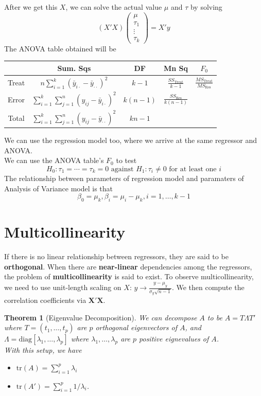 \documentclass[11pt]{article}
\newcommand{\tr}{\mathrm{tr}}
\newtheorem{theorem}{Theorem}[section]
\theoremstyle{definition}
\begin{document}
After we get this $X$, we can solve the actual value $\mu$ and $\tau$ by solving
\[
(X'X)\begin{pmatrix} \mu\\\tau_1\\\vdots\\\tau_k\end{pmatrix}=X'y
\]
The ANOVA table obtained will be
\begin{table}[h]
\centering
\begin{tabular}{|c|c|c|c|c|}
\hline
 & Sum. Sqs & DF & Mn Sq & $F_0$\\\hline
Treat & $\displaystyle n\sum_{i=1}^k(\bar{y}_{i\cdot}-\bar{y}_{\cdot\cdot})^2$ & $k-1$ & $\frac{SS_\text{Treat}}{k-1}$ & $\displaystyle\frac{MS_\text{Treat}}{MS_\text{Res}}$\\\hline
Error & $\displaystyle\sum_{i=1}^k\sum_{j=1}^n (y_{ij}-\bar{y}_{i\cdot})^2$ & $k(n-1)$ & $\frac{SS_\text{Res}}{k(n-1)}$ & \\\hline
Total & $\displaystyle\sum_{i=1}^k\sum_{j=1}^n (y_{ij}-\bar{y}_{\cdot\cdot})^2$ & $kn-1$ & & \\\hline
\end{tabular}
\end{table}
We can use the regression model too, where we arrive at the same regressor and ANOVA.\\
We can use the ANOVA table's $F_0$ to test
\[
H_0:\tau_1=\cdots=\tau_k=0\text{ against } H_1:\tau_i\neq 0\text{ for at least one }i
\]
The relationship between parameters of regression model and paramaters of Analysis of Variance model is that
\[
\beta_0=\mu_k, \beta_i=\mu_i-\mu_k, i = 1,\ldots, k-1
\]
\section{Multicollinearity}
If there is no linear relationship between regressors, they are said to be \textbf{orthogonal}. When there are \textbf{near-linear} dependencies among the regressors, the problem of \textbf{multicollinearity} is said to exist.
To observe multicollinearity, we need to use unit-length scaling on $X$: $y\to \frac{y-\mu_y}{\sigma_y\sqrt{n-1}}$. We then compute the correlation coefficients via $\bm{X}'\bm{X}$.
\begin{theorem}[Eigenvalue Decomposition]
\normalfont We can decompose $A$ to be $A=T\Lambda T'$ where $T=(t_1,\ldots, t_p)$ are $p$ orthogonal eigenvectors of $A$, and $\Lambda = \text{diag}[\lambda_1,\ldots, \lambda_p]$ where $\lambda_1,\ldots, \lambda_p$ are $p$ \textit{positive} eignevalues of $A$.\\
With this setup, we have 
\begin{itemize}
  \item $\tr(A)=\sum_{i=1}^p \lambda_i$
  \item $\tr(A')=\sum_{i=1}^p 1/\lambda_i$.
\end{itemize}
\end{theorem}
\end{document}
